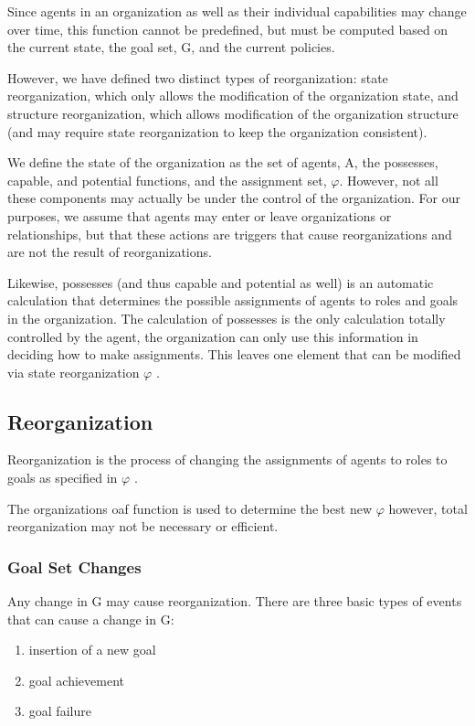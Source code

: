 Since agents in an organization as well as their individual capabilities may change over time, 
this function cannot be predefined, but must be computed based on the current state, the goal set, G, and the current policies.

However, we have defined two distinct types of reorganization: state reorganization, which only allows the modification of the organization state, and structure reorganization, which allows modification of the organization structure (and may require state reorganization to keep the organization consistent).

We define the state of the organization as the set of agents, A, the possesses, capable, and potential functions, and the assignment set, $\varphi$. However, not all these components may actually be under the control of the organization. For our purposes, we assume that agents may enter or leave organizations or relationships, but that these actions are triggers that cause reorganizations and are not the result of reorganizations. 

Likewise, possesses (and thus capable and potential as well) is an automatic calculation that determines the possible assignments of agents to roles and goals in the organization. The calculation of possesses is the only calculation totally controlled by the agent, the organization can only use this information in deciding how to make assignments. This leaves one element that can be modified via state reorganization $\varphi$ \cite{omacs2}.
	
\subsection{Reorganization}
Reorganization is the process of changing the assignments of agents to roles to goals as specified
in $\varphi$ \cite{omacs2}.

The organizations oaf function is used to determine the best new $\varphi$ however, total
reorganization may not be necessary or efficient.


\subsubsection{Goal Set Changes}
Any change in G may cause reorganization. There are three basic types 
of events that can cause a change in G: 
\begin{enumerate}
\item insertion of a new goal 
\item goal achievement 
\item goal failure
\end{enumerate}

